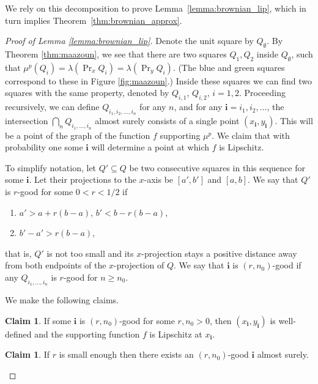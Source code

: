 \documentclass{article}
\theoremstyle{definition}
\newtheorem{claim}[theorem]{Claim}
\begin{document}
We rely on this decomposition to prove Lemma~\ref{lemma:brownian_lip}, which in turn implies Theorem~\ref{thm:brownian_approx}.

\begin{proof}[Proof of Lemma \ref{lemma:brownian_lip}]
    Denote the unit square by $Q_{\emptyset}$. By Theorem \ref{thm:maazoun}, we see that there are two squares $Q_1, Q_2$ inside $Q_{\emptyset}$, such that $\mu^p(Q_i) = \lambda(\Pr_x Q_i)=\lambda(\Pr_y Q_i)$. (The blue and green squares correspond to these in Figure \ref{fig:maazoun}.) Inside these squares we can find two squares with the same property, denoted by $Q_{i, 1}$, $Q_{i, 2}$, $i=1, 2$. Proceeding recursively, we can define $Q_{i_1, i_2, \dots, i_n}$ for any $n$, and for any $\mathbf{i}=i_1, i_2, \dots$, the intersection $\bigcap_{n} Q_{i_1, \dots, i_n}$ almost surely consists of a single point $(x_{\mathbf{i}}, y_{\mathbf{i}})$. This will be a point of the graph of the function $f$ supporting $\mu^p$. We claim that with probability one some $\mathbf{i}$ will determine a point at which $f$ is Lipschitz.

    To simplify notation, let $Q'\subseteq Q$ be two consecutive squares in this sequence for some $\mathbf{i}$. Let their projections to the $x$-axis be $[a', b']$ and $[a, b]$. We say that $Q'$ is $r$-good for some $0<r<1/2$ if
    \begin{enumerate}[before=\leavevmode,label=\upshape(\Roman*)]
        \item\label{cond1} $a'>a+r(b-a)$, $b'<b-r(b-a)$,
        \item\label{cond2} $b'-a'>r(b-a)$,
    \end{enumerate}
    that is, \(Q'\) is not too small and its \(x\)-projection stays a positive distance away from both endpoints of the \(x\)-projection of \(Q\). We say that $\mathbf{i}$ is $(r, n_0)$-good if any $Q_{i_1, ..., i_n}$ is $r$-good for $n\geq n_0$. 

    We make the following claims.
    
    \begin{claim} \label{claim:good_implies_lip}
        If some $\mathbf{i}$ is $(r, n_0)$-good for some $r, n_0>0$, then $(x_{\mathbf{i}}, y_{\mathbf{i}})$ is well-defined and the supporting function \(f\) is Lipschitz at \(x_{\mathbf{i}}\).
    \end{claim}

    \begin{claim}\label{claim:exists_good}
        If $r$ is small enough then there exists an $(r, n_0)$-good $\mathbf{i}$ almost surely.
    \end{claim}


\end{proof}
\end{document}
